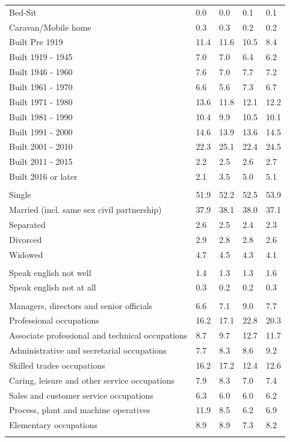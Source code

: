 \documentclass{article}
\begin{document}
\begin{table}[h]
\begin{tabular}{KTTTT}
Bed-Sit & 0.0& 0.0& 0.1& 0.1\\
Caravan/Mobile home & 0.3& 0.3& 0.2& 0.2\\
    \hline
Built Pre 1919 & 11.4& 11.6& 10.5&  8.4\\
Built 1919 - 1945 & 7.0& 7.0& 6.4& 6.2\\
Built  1946 - 1960 & 7.6& 7.0& 7.7& 7.2\\
Built  1961 - 1970 & 6.6& 5.6& 7.3& 6.7\\
Built  1971 - 1980 & 13.6& 11.8& 12.1& 12.2\\
Built  1981 - 1990 & 10.4&  9.9& 10.5& 10.1\\
Built  1991 - 2000 & 14.6& 13.9& 13.6& 14.5\\
Built  2001 - 2010 & 22.3& 25.1& 22.4& 24.5\\
Built  2011 - 2015 & 2.2& 2.5& 2.6& 2.7\\
Built  2016 or later & 2.1& 3.5& 5.0& 5.1\\
\hline
    \\
    \hline
Single & 51.9& 52.2& 52.5& 53.9\\
Married (incl. same sex civil partnership) & 37.9& 38.1& 38.0& 37.1\\
Separated  & 2.6& 2.5& 2.4& 2.3\\
Divorced  & 2.9& 2.8& 2.8& 2.6\\
Widowed & 4.7& 4.5& 4.3& 4.1\\
\hline
    \\ 
    \hline
Speak english not well & 1.4& 1.3& 1.3& 1.6\\
Speak english not at all & 0.3& 0.2& 0.2& 0.3\\
\hline
    \\
    \hline
Managers, directors and senior officials & 6.6& 7.1& 9.0& 7.7\\
Professional occupations & 16.2& 17.1& 22.8& 20.3\\
Associate professional and technical occupations &  8.7&  9.7& 12.7& 11.7\\
Administrative and secretarial occupations & 7.7& 8.3& 8.6& 9.2\\
Skilled trades occupations & 16.2& 17.2& 12.4& 12.6\\
Caring, leisure and other service occupations & 7.9& 8.3& 7.0& 7.4\\
Sales and customer service occupations & 6.3& 6.0& 6.0& 6.2\\
Process, plant and machine operatives & 11.9&  8.5&  6.2&  6.9\\
Elementary occupations & 8.9& 8.9& 7.3& 8.2\\
\hline
\end{tabular}
\end{table}
\end{document}
